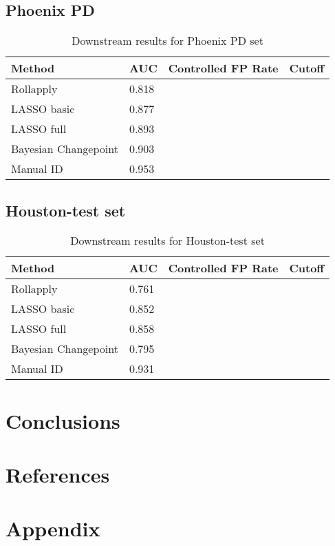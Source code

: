 \documentclass[12pt]{article}
\begin{document}
\subsection{Phoenix PD}

\begin{table}[]
\centering
\caption{Downstream results for Phoenix PD set}
\begin{tabular}{llll}
\textbf{Method} & \textbf{AUC} & \textbf{Controlled FP Rate} & \textbf{Cutoff} \\ \hline
Rollapply & 0.818 &  & \\ \hline
LASSO basic & 0.877 &  &  \\ \hline
LASSO full & 0.893 &  &  \\ \hline
Bayesian Changepoint & 0.903 &  & \\ \hline
Manual ID & 0.953 &  & \\ \hline 
\end{tabular}
\end{table}

\subsection{Houston-test set}

\begin{table}[]
\centering
\caption{Downstream results for Houston-test set}
\begin{tabular}{llll}
\textbf{Method} & \textbf{AUC} & \textbf{Controlled FP Rate} & \textbf{Cutoff} \\ \hline
Rollapply & 0.761 &  & \\ \hline
LASSO basic & 0.852 &  &  \\ \hline
LASSO full & 0.858 &  &  \\ \hline
Bayesian Changepoint & 0.795 &  & \\ \hline
Manual ID & 0.931 &  & \\ \hline 
\end{tabular} 
\end{table}

\section{Conclusions}

\section{References}

\section{Appendix}
\end{document}
